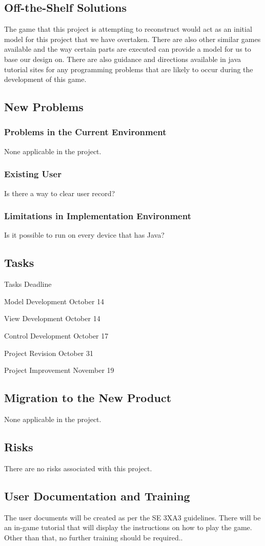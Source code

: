 \documentclass[12pt,letterpaper]{article}
\begin{document}
\subsection{Off-the-Shelf Solutions}
The game that this project is attempting to reconstruct would act as an initial model for this project that we have overtaken. There are also other similar games available and the way certain parts are executed can provide a model for us to base our design on. There are also guidance and directions available in java tutorial sites for any programming problems that are likely to occur during the development of this game.  
\subsection{New Problems}
\subsubsection{Problems in the Current Environment}
None applicable in the project.
\subsubsection{Existing User}
Is there a way to clear user record?
\subsubsection{Limitations in Implementation Environment} 
Is it possible to run on every device that has Java?
\subsection{Tasks}
Tasks Deadline

Model Development October 14

View Development October 14

Control Development October 17

Project Revision October 31

Project Improvement November 19
\subsection{Migration to the New Product}
None applicable in the project.
\subsection{Risks}
There are no risks associated with this project.
\subsection{User Documentation and Training}
The user documents will be created as per the SE 3XA3 guidelines.
There will be an in-game tutorial that will display the instructions on how to play the game. Other than that, no further training should be required..
\end{document}
